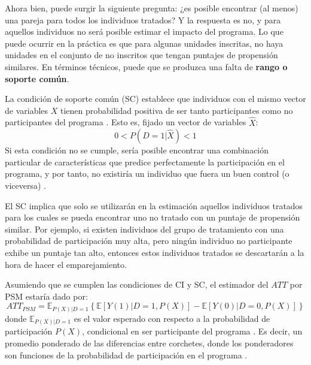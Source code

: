 \documentclass[../../main.tex]{subfiles}
\begin{document}
Ahora bien, puede surgir la siguiente pregunta: ¿es posible encontrar (al menos) una pareja
para todos los individuos tratados? Y la respuesta es no, y para aquellos individuos no
será posible estimar el impacto del programa. Lo que puede ocurrir en la práctica es que
para algunas unidades inscritas, no haya unidades en el conjunto de no inscritos que
tengan puntajes de propensión similares. En términos técnicos, puede que se produzca una
falta de \textbf{rango o soporte común}.

La condición de soporte común (SC) establece que individuos con el mismo vector de
variables \(X\) tienen probabilidad positiva de ser tanto participantes como no
participantes del programa \cite{bernal}. Esto es, fijado un vector de variables
\(\hat{X}\):
\[0 < P(D=1|\hat{X}) < 1\]
Si esta condición no se cumple, sería posible encontrar una combinación particular de
características que predice perfectamente la participación en el programa, y por tanto,
no existiría un individuo que fuera un buen control (o viceversa) \cite{bernal}.

El SC implica que solo se utilizarán en la estimación aquellos individuos tratados para
los cuales se pueda encontrar uno no tratado con un puntaje de propensión similar. Por
ejemplo, si existen individuos del grupo de tratamiento con una probabilidad de
participación muy alta, pero ningún individuo no participante exhibe un puntaje tan alto,
entonces estos individuos tratados se descartarán a la hora de hacer el emparejamiento.

Asumiendo que se cumplen las condiciones de CI y SC, el estimador del \(ATT\) por PSM
estaría dado por:
\begin{equation}
ATT_{PSM} = \mathbb{E}_{P(X)|D=1}
    \left\{
        \mathbb{E}\left[Y(1)|D=1, P(X)\right] - \mathbb{E}\left[Y(0)|D=0, P(X)\right]
    \right\}
    \label{ATT-PSM}
\end{equation}
donde \(\mathbb{E}_{P(X)|D=1}\) es el valor esperado con respecto a la probabilidad de
participación \(P(X)\), condicional en ser participante del programa \cite{bernal}. Es
decir, un promedio ponderado de las diferencias entre corchetes, donde los ponderadores
son funciones de la probabilidad de participación en el programa \cite{bernal}.
\end{document}
